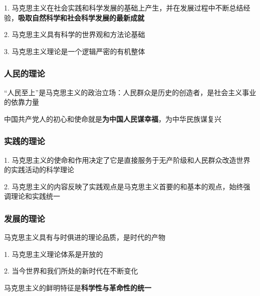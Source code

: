 1. 马克思主义在社会实践和科学发展的基础上产生，并在发展过程中不断总结经验，\textbf{吸取自然科学和社会科学发展的最新成就}

2. 马克思主义具有科学的世界观和方法论基础

3. 马克思主义理论是一个逻辑严密的有机整体

\subsubsection{人民的理论}%
\label{subsub:人民的理论}
“人民至上”是马克思主义的政治立场：人民群众是历史的创造者，是社会主义事业的依靠力量
\begin{notation}
    中国共产党人的初心和使命就是\textbf{为中国人民谋幸福}，为中华民族谋复兴
\end{notation}
\subsubsection{实践的理论}%
\label{subsub:实践的理论}
1. 马克思主义的使命和作用决定了它是直接服务于无产阶级和人民群众改造世界的实践活动的科学理论

2. 马克思主义的内容反映了实践观点是马克思主义首要的和基本的观点，始终强调理论和实践统一
\subsubsection{发展的理论}%
\label{subsub:发展的理论}
马克思主义具有与时俱进的理论品质，是时代的产物

1. 马克思主义理论体系是开放的

2. 当今世界和我们所处的新时代在不断变化
\begin{notation}
    马克思主义的鲜明特征是\textbf{科学性与革命性的统一}
\end{notation}
